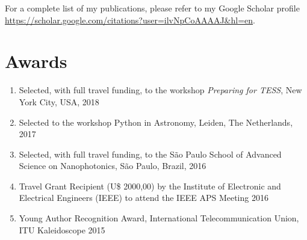 \documentclass[10pt]{article}
\begin{document}
\begin{titlepage}
For a complete list of my publications, please refer to my Google Scholar profile \url{https://scholar.google.com/citations?user=ilvNpCoAAAAJ&hl=en}.

\section*{Awards}
\begin{enumerate}
  \item Selected, with full travel funding, to the workshop \textit{Preparing for TESS}, New York City, USA, 2018
  \item Selected to the workshop \textsf{Python} in Astronomy, Leiden, The Netherlands, 2017
  \item Selected, with full travel funding, to the S\~ao Paulo School of Advanced Science on Nanophotonics, S\~ao Paulo, Brazil, 2016
  \item Travel Grant Recipient (U\$ 2000,00) by the Institute of Electronic and Electrical Engineers (IEEE) to attend the IEEE APS Meeting 2016
  \item Young Author Recognition Award, International Telecommunication Union, ITU Kaleidoscope 2015
\end{enumerate}


\end{titlepage}
\end{document}
